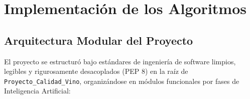 \documentclass{article}
\begin{document}

\section{Implementación de los Algoritmos}

\subsection{Arquitectura Modular del Proyecto}

El proyecto se estructuró bajo estándares de ingeniería de software limpios, legibles y rigurosamente desacoplados (PEP 8) en la raíz de \texttt{Proyecto\_Calidad\_Vino}, organizándose en módulos funcionales por fases de Inteligencia Artificial:
\end{document}
